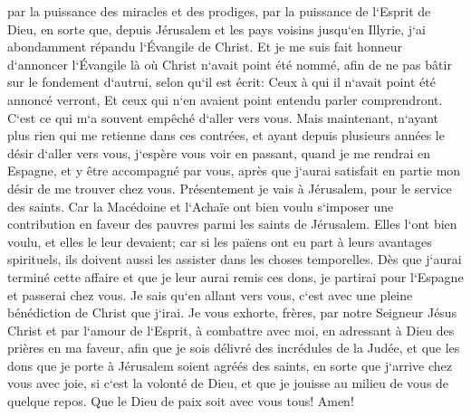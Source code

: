 \verse par la puissance des miracles et des prodiges, par la puissance de l`Esprit de Dieu, en sorte que, depuis Jérusalem et les pays voisins jusqu`en Illyrie, j`ai abondamment répandu l`Évangile de Christ. 
\verse Et je me suis fait honneur d`annoncer l`Évangile là où Christ n`avait point été nommé, afin de ne pas bâtir sur le fondement d`autrui, selon qu`il est écrit: 
\verse Ceux à qui il n`avait point été annoncé verront, Et ceux qui n`en avaient point entendu parler comprendront. 
\verse C`est ce qui m`a souvent empêché d`aller vers vous. 
\verse Mais maintenant, n`ayant plus rien qui me retienne dans ces contrées, et ayant depuis plusieurs années le désir d`aller vers vous, 
\verse j`espère vous voir en passant, quand je me rendrai en Espagne, et y être accompagné par vous, après que j`aurai satisfait en partie mon désir de me trouver chez vous. 
\verse Présentement je vais à Jérusalem, pour le service des saints. 
\verse Car la Macédoine et l`Achaïe ont bien voulu s`imposer une contribution en faveur des pauvres parmi les saints de Jérusalem. 
\verse Elles l`ont bien voulu, et elles le leur devaient; car si les païens ont eu part à leurs avantages spirituels, ils doivent aussi les assister dans les choses temporelles. 
\verse Dès que j`aurai terminé cette affaire et que je leur aurai remis ces dons, je partirai pour l`Espagne et passerai chez vous. 
\verse Je sais qu`en allant vers vous, c`est avec une pleine bénédiction de Christ que j`irai. 
\verse Je vous exhorte, frères, par notre Seigneur Jésus Christ et par l`amour de l`Esprit, à combattre avec moi, en adressant à Dieu des prières en ma faveur, 
\verse afin que je sois délivré des incrédules de la Judée, et que les dons que je porte à Jérusalem soient agréés des saints, 
\verse en sorte que j`arrive chez vous avec joie, si c`est la volonté de Dieu, et que je jouisse au milieu de vous de quelque repos. 
\verse Que le Dieu de paix soit avec vous tous! Amen! 

